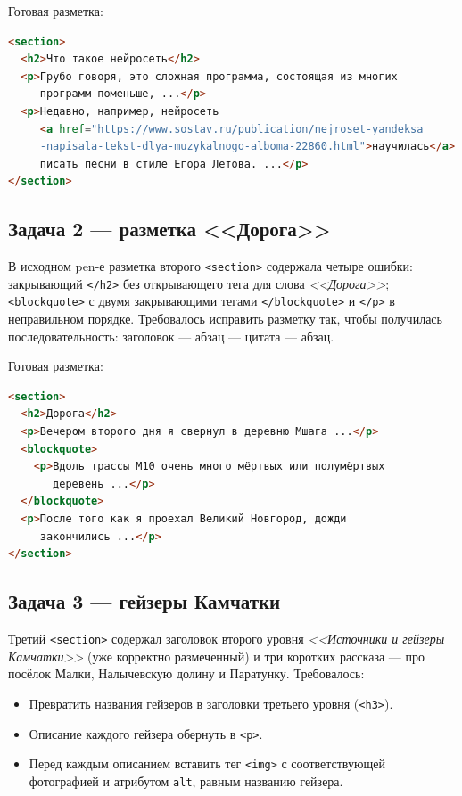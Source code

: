 Готовая разметка:
\begin{lstlisting}[language=HTML]
<section>
  <h2>Что такое нейросеть</h2>
  <p>Грубо говоря, это сложная программа, состоящая из многих
     программ поменьше, ...</p>
  <p>Недавно, например, нейросеть
     <a href="https://www.sostav.ru/publication/nejroset-yandeksa
     -napisala-tekst-dlya-muzykalnogo-alboma-22860.html">научилась</a>
     писать песни в стиле Егора Летова. ...</p>
</section>
\end{lstlisting}

\subsection{Задача 2 --- разметка <<Дорога>>}

В исходном pen-е разметка второго \texttt{<section>} содержала
четыре ошибки: закрывающий \texttt{</h2>} без открывающего тега для
слова \textit{<<Дорога>>}; \texttt{<blockquote>} с двумя
закрывающими тегами \texttt{</blockquote>} и \texttt{</p>} в
неправильном порядке. Требовалось исправить разметку так, чтобы
получилась последовательность: заголовок --- абзац --- цитата ---
абзац.

Готовая разметка:
\begin{lstlisting}[language=HTML]
<section>
  <h2>Дорога</h2>
  <p>Вечером второго дня я свернул в деревню Мшага ...</p>
  <blockquote>
    <p>Вдоль трассы М10 очень много мёртвых или полумёртвых
       деревень ...</p>
  </blockquote>
  <p>После того как я проехал Великий Новгород, дожди
     закончились ...</p>
</section>
\end{lstlisting}

\subsection{Задача 3 --- гейзеры Камчатки}

Третий \texttt{<section>} содержал заголовок второго уровня
\textit{<<Источники и гейзеры Камчатки>>} (уже корректно
размеченный) и три коротких рассказа --- про посёлок Малки,
Налычевскую долину и Паратунку. Требовалось:
\begin{itemize}
  \item Превратить названия гейзеров в заголовки третьего уровня
        (\texttt{<h3>}).
  \item Описание каждого гейзера обернуть в \texttt{<p>}.
  \item Перед каждым описанием вставить тег \texttt{<img>} с
        соответствующей фотографией и атрибутом \texttt{alt},
        равным названию гейзера.
\end{itemize}

